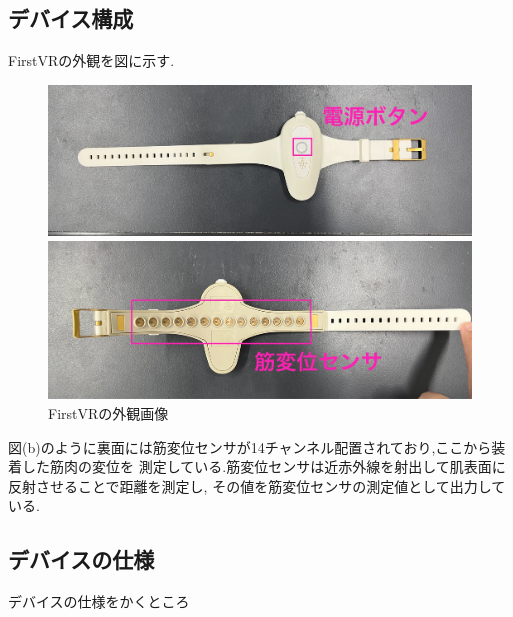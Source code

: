 \documentclass{ltjsreport}
\begin{document}
		\subsection{デバイス構成}
				FirstVRの外観を図に示す.
				\begin{figure}[H]
				\centering
				\begin{minipage}{0.75\columnwidth}
				\centering
				\includegraphics[width = \columnwidth]{../figs/IMG_0337.JPG}
				\end{minipage}
				\hspace{0.04\columnwidth}
				\begin{minipage}{0.75\columnwidth}
				\centering
				\includegraphics[width = \columnwidth]{../figs/IMG_0336.JPG}
				\end{minipage}
				\caption{FirstVRの外観画像}
				\label{fig:FirstVR}
				\end{figure}
\vspace{-15pt}

			図(b)のように裏面には筋変位センサが14チャンネル配置されており,ここから装着した筋肉の変位を
			測定している.筋変位センサは近赤外線を射出して肌表面に反射させることで距離を測定し,
			その値を筋変位センサの測定値として出力している.

		\subsection{デバイスの仕様}
			デバイスの仕様をかくところ
			
\end{document}
